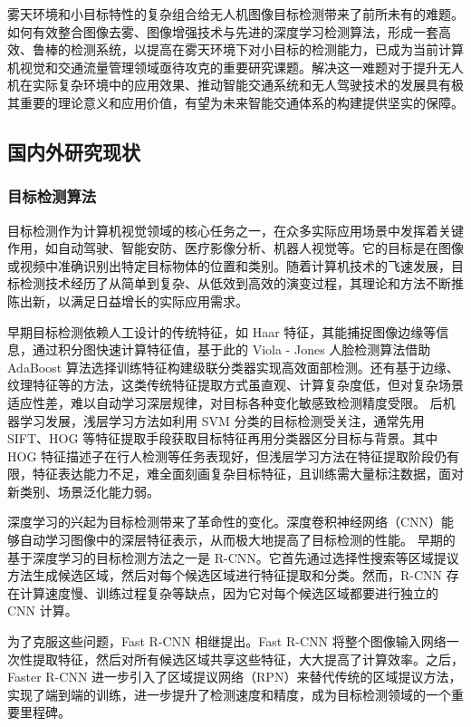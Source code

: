 雾天环境和小目标特性的复杂组合给无人机图像目标检测带来了前所未有的难题。如何有效整合图像去雾、图像增强技术与先进的深度学习检测算法，形成一套高效、鲁棒的检测系统，以提高在雾天环境下对小目标的检测能力，已成为当前计算机视觉和交通流量管理领域亟待攻克的重要研究课题。解决这一难题对于提升无人机在实际复杂环境中的应用效果、推动智能交通系统和无人驾驶技术的发展具有极其重要的理论意义和应用价值，有望为未来智能交通体系的构建提供坚实的保障。


\subsection{国内外研究现状}

\subsubsection{目标检测算法}

目标检测作为计算机视觉领域的核心任务之一，在众多实际应用场景中发挥着关键作用，如自动驾驶、智能安防、医疗影像分析、机器人视觉等。它的目标是在图像或视频中准确识别出特定目标物体的位置和类别。随着计算机技术的飞速发展，目标检测技术经历了从简单到复杂、从低效到高效的演变过程，其理论和方法不断推陈出新，以满足日益增长的实际应用需求。

早期目标检测依赖人工设计的传统特征，如 Haar \cite{Haar_like} 特征，其能捕捉图像边缘等信息，通过积分图快速计算特征值，基于此的 Viola - Jones 人脸检测算法借助 AdaBoost 算法选择训练特征构建级联分类器实现高效面部检测。还有基于边缘、纹理特征等的方法，这类传统特征提取方式虽直观、计算复杂度低，但对复杂场景适应性差，难以自动学习深层规律，对目标各种变化敏感致检测精度受限。
后机器学习发展，浅层学习方法如利用 SVM 分类的目标检测受关注\cite{svm}，通常先用 SIFT、HOG 等特征提取手段获取目标特征再用分类器区分目标与背景。其中 HOG 特征描述子在行人检测等任务表现好，但浅层学习方法在特征提取阶段仍有限，特征表达能力不足，难全面刻画复杂目标特征，且训练需大量标注数据，面对新类别、场景泛化能力弱。

深度学习的兴起为目标检测带来了革命性的变化。深度卷积神经网络（CNN）\cite{cnn}能够自动学习图像中的深层特征表示，从而极大地提高了目标检测的性能。
早期的基于深度学习的目标检测方法之一是 R-CNN\cite{girshick2014rich, fast_rcnn, faster_rcnn, mask_rcnn}。它首先通过选择性搜索等区域提议方法生成候选区域，然后对每个候选区域进行特征提取和分类。然而，R-CNN 存在计算速度慢、训练过程复杂等缺点，因为它对每个候选区域都要进行独立的 CNN 计算。

为了克服这些问题，Fast R-CNN 相继提出。Fast R-CNN 将整个图像输入网络一次性提取特征，然后对所有候选区域共享这些特征，大大提高了计算效率。之后，Faster R-CNN 进一步引入了区域提议网络（RPN）来替代传统的区域提议方法，实现了端到端的训练，进一步提升了检测速度和精度，成为目标检测领域的一个重要里程碑。

